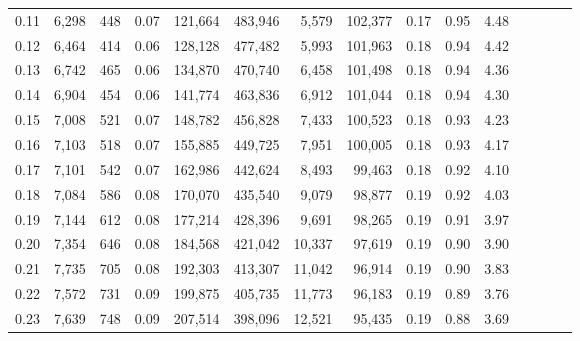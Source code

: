 \begin{tabular}{rrrcrrrrrrrrrrr}
0.11 &   6,298 &     448 &                                       0.07 &  121,664 &  483,946 &    5,579 &  102,377 &  0.17 &  0.95 &                         4.48 \\
0.12 &   6,464 &     414 &                                       0.06 &  128,128 &  477,482 &    5,993 &  101,963 &  0.18 &  0.94 &                         4.42 \\
0.13 &   6,742 &     465 &                                       0.06 &  134,870 &  470,740 &    6,458 &  101,498 &  0.18 &  0.94 &                         4.36 \\
0.14 &   6,904 &     454 &                                       0.06 &  141,774 &  463,836 &    6,912 &  101,044 &  0.18 &  0.94 &                         4.30 \\
0.15 &   7,008 &     521 &                                       0.07 &  148,782 &  456,828 &    7,433 &  100,523 &  0.18 &  0.93 &                         4.23 \\
0.16 &   7,103 &     518 &                                       0.07 &  155,885 &  449,725 &    7,951 &  100,005 &  0.18 &  0.93 &                         4.17 \\
0.17 &   7,101 &     542 &                                       0.07 &  162,986 &  442,624 &    8,493 &   99,463 &  0.18 &  0.92 &                         4.10 \\
0.18 &   7,084 &     586 &                                       0.08 &  170,070 &  435,540 &    9,079 &   98,877 &  0.19 &  0.92 &                         4.03 \\
0.19 &   7,144 &     612 &                                       0.08 &  177,214 &  428,396 &    9,691 &   98,265 &  0.19 &  0.91 &                         3.97 \\
0.20 &   7,354 &     646 &                                       0.08 &  184,568 &  421,042 &   10,337 &   97,619 &  0.19 &  0.90 &                         3.90 \\
0.21 &   7,735 &     705 &                                       0.08 &  192,303 &  413,307 &   11,042 &   96,914 &  0.19 &  0.90 &                         3.83 \\
0.22 &   7,572 &     731 &                                       0.09 &  199,875 &  405,735 &   11,773 &   96,183 &  0.19 &  0.89 &                         3.76 \\
0.23 &   7,639 &     748 &                                       0.09 &  207,514 &  398,096 &   12,521 &   95,435 &  0.19 &  0.88 &                         3.69 \\

\end{tabular}
